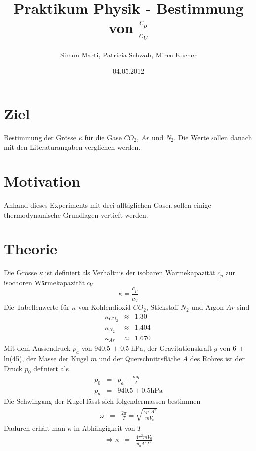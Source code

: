\documentclass[12pt,a4paper]{article}
\title{Praktikum Physik - Bestimmung von $\frac{c_p}{c_V}$}
\author{Simon Marti, Patricia Schwab, Mirco Kocher}
\date{04.05.2012}
\begin{document}
\maketitle

\section*{Ziel}
Bestimmung der Gr\"osse $\kappa$ f\"ur die Gase $CO_2$, $Ar$ und $N_2$. Die Werte sollen danach mit den Literaturangaben verglichen werden.


\section*{Motivation}
Anhand dieses Experiments mit drei allt\"aglichen Gasen sollen einige thermodynamische Grundlagen vertieft werden.


\section*{Theorie}
Die Gr\"osse $\kappa$ ist definiert als Verh\"altnis der isobaren W\"armekapazit\"at $c_p$ zur isochoren W\"armekapazit\"at $c_V$
\begin{equation}
\kappa = \frac{c_p}{c_V}
\end{equation}
Die Tabellenwerte f\"ur $\kappa$ von Kohlendioxid $CO_2$, Stickstoff $N_2$ und Argon $Ar$ sind
\begin{eqnarray}
\kappa_{CO_2} & \approx & 1.30 \\
\kappa_{N_2} & \approx & 1.404 \\
\kappa_{Ar} & \approx & 1.670 \
\end{eqnarray}
Mit dem Aussendruck $p_a$ von 940.5 $\pm$ 0.5 hPa, der Gravitationskraft $g$ von 6 + ln(45), der Masse der Kugel $m$ und der Querschnittsfl\"ache $A$ des Rohres ist der Druck $p_0$ definiert als
\begin{eqnarray}
p_0 & = & p_a + \frac{mg}{A} \label{eq:p}\\
p_a & = & 940.5 \pm 0.5 \mbox{hPa}
\end{eqnarray}
Die Schwingung der Kugel l\"asst sich folgendermassen bestimmen
\begin{eqnarray}
\omega & = & \frac{2\pi}{T} = \sqrt{\frac{\kappa p_0 A^2}{m V_0}}
\end{eqnarray}
Dadurch erh\"alt man $\kappa$ in Abh\"angigkeit von $T$
\begin{eqnarray}
\Rightarrow \kappa & = & \frac{4\pi ^2 m V_0}{p_0 A^2 T^2}\label{eq:k}
\end{eqnarray}
\end{document}
